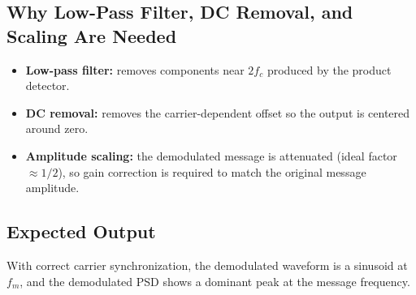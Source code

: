 \subsection*{Why Low-Pass Filter, DC Removal, and Scaling Are Needed}
\begin{itemize}
\item \textbf{Low-pass filter:} removes components near $2f_c$ produced by the product detector.
\item \textbf{DC removal:} removes the carrier-dependent offset so the output is centered around zero.
\item \textbf{Amplitude scaling:} the demodulated message is attenuated (ideal factor $\approx 1/2$), so gain correction is required to match the original message amplitude.
\end{itemize}

\subsection*{Expected Output}
With correct carrier synchronization, the demodulated waveform is a sinusoid at $f_m$, and the demodulated PSD shows a dominant peak at the message frequency.
